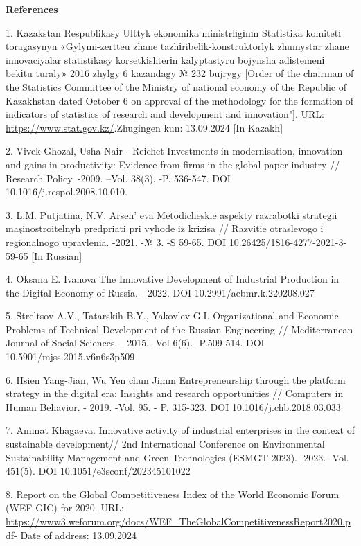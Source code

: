 \begin{center}
{\bfseries References}
\end{center}

\begin{references}
1. Kazakstan Respublikasy Ulttyk ekonomika ministrlіgіnіn Statistika
komitetі toragasynyn «Gylymi-zertteu zhane tazhіribelіk-konstruktorlyk
zhumystar zhane innovaciyalar statistikasy korsetkіshterіn kalyptastyru
bojynsha adіstemenі bekіtu turaly» 2016 zhylgy 6 kazandagy № 232 bujrygy
{[}Order of the chairman of the Statistics Committee of the Ministry of
national economy of the Republic of Kazakhstan dated October 6 on
approval of the methodology for the formation of indicators of
statistics of research and development and innovation"{]}. URL:
\url{https://www.stat.gov.kz/}.Zhugingen kun: 13.09.2024 {[}In Kazakh{]}

2. Vivek Ghozal, Usha Nair - Reichet Investments in modernisation,
innovation and gains in productivity: Evidence from firms in the global
paper industry // Research Policy. -2009. --Vol. 38(3). -P. 536-547. DOI
10.1016/j.respol.2008.10.010.

3. L.M. Putjatina, N.V. Arsen' eva Metodicheskie aspekty
razrabotki strategii maşinostroitelnyh predpriati pri vyhode iz krizisa
// Razvitie otraslevogo i regionälnogo upravlenia. -2021. -№ 3. -S
59-65. DOI 10.26425/1816-4277-2021-3-59-65 {[}In Russian{]}

4. Oksana E. Ivanova The Innovative Development of Industrial Production
in the Digital Economy of Russia. - 2022. DOI 10.2991/aebmr.k.220208.027

5. Streltsov A.V., Tatarskih B.Y., Yakovlev G.I. Organizational and
Economic Problems of Technical Development of the Russian Engineering //
Mediterranean Journal of Social Sciences. - 2015. -Vol 6(6).- P.509-514.
DOI 10.5901/mjss.2015.v6n6s3p509

6. Hsien Yang-Jian, Wu Yen chun Jimm Entrepreneurship through the
platform strategy in the digital era: Insights and research
opportunities // Computers in Human Behavior. - 2019. -Vol. 95. - P.
315-323. DOI 10.1016/j.chb.2018.03.033

7. Aminat Khagaeva. Innovative activity of industrial enterprises in the
context of sustainable development// 2nd International Conference on
Environmental Sustainability Management and Green Technologies (ESMGT
2023). -2023. -Vol. 451(5). DOI 10.1051/e3sconf/202345101022

8. Report on the Global Competitiveness Index of the World Economic
Forum (WEF GIC) for 2020. URL:
\url{https://www3.weforum.org/docs/WEF_TheGlobalCompetitivenessReport2020.pdf-}
Date of address: 13.09.2024


\end{references}
